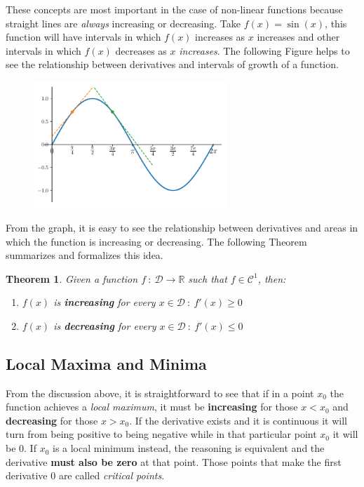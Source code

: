 \documentclass[a4paper,11pt]{article}
\theoremstyle{definition}
\theoremstyle{plain}
\newtheorem{theorem}{Theorem}
\begin{document}
These concepts are most important in the case of non-linear functions
because straight lines are \emph{always} increasing or decreasing. Take
\(f(x) = \sin(x)\), this function will have intervals in which \(f(x)\)
increases as \(x\) increases and other intervals in which \(f(x)\)
decreases as \(x\) \emph{increases}. The following Figure helps to see
the relationship between derivatives and intervals of growth of a
function.

    \begin{figure}[htbp]
    	\centering 
    		\includegraphics[width = 0.65\textwidth]{Ch2_files/Ch2_19_0.pdf}
    \end{figure}
    
    From the graph, it is easy to see the relationship between derivatives
and areas in which the function is increasing or decreasing. The
following Theorem summarizes and formalizes this idea.

\begin{theorem}
Given a function
\(f \ : \ \mathcal{D}\rightarrow\mathbb{R}\) such that
\(f\in\mathcal{C}^1\), then: 

\begin{enumerate}
    \item \(f(x)\) is \textbf{increasing} for every \(x\in\mathcal{D} \ : \ f'(x) \geq 0\) 

    \item \(f(x)\) is \textbf{decreasing} for every \(x\in\mathcal{D} \ : \ f'(x) \leq 0\)
\end{enumerate}
\end{theorem}

\subsection{Local Maxima and Minima}\label{local-maxima-and-minima}

From the discussion above, it is straightforward to see that if in a
point \(x_0\) the function achieves a \emph{local maximum}, it must be
\textbf{increasing} for those \(x < x_0\) and \textbf{decreasing} for
those \(x > x_0\). If the derivative exists and it is continuous it will
turn from being positive to being negative while in that particular
point \(x_0\) it will be \(0\). If \(x_0\) is a local minimum instead,
the reasoning is equivalent and the derivative \textbf{must also be
zero} at that point. Those points that make the first derivative \(0\)
are called \emph{critical points}.
\end{document}
